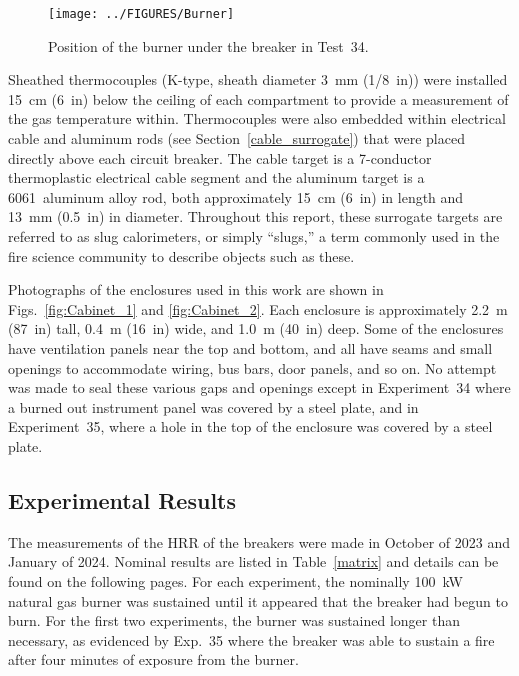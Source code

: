 \begin{figure}[ht]
\centering
\texttt{[image: ../FIGURES/Burner]}
\caption[Position of the burner] {Position of the burner under the breaker in Test~34.}
\label{fig:Burner}
\end{figure}

Sheathed thermocouples (K-type, sheath diameter 3~mm (1/8~in)) were installed 15~cm (6~in) below the ceiling of each compartment to provide a measurement of the gas temperature within. Thermocouples were also embedded within electrical cable and aluminum rods (see Section~\ref{cable_surrogate}) that were placed directly above each circuit breaker. The cable target is a 7-conductor thermoplastic electrical cable segment and the aluminum target is a 6061~aluminum alloy rod, both approximately  15~cm (6~in) in length and 13~mm (0.5~in) in diameter. Throughout this report, these surrogate targets are referred to as slug calorimeters, or simply ``slugs,'' a term commonly used in the fire science community to describe objects such as these.

Photographs of the enclosures used in this work are shown in Figs.~\ref{fig:Cabinet_1} and \ref{fig:Cabinet_2}. Each enclosure is approximately 2.2~m (87~in) tall, 0.4~m (16~in) wide, and 1.0~m (40~in) deep. Some of the enclosures have ventilation panels near the top and bottom, and all have seams and small openings to accommodate wiring, bus bars, door panels, and so on. No attempt was made to seal these various gaps and openings except in Experiment~34 where a burned out instrument panel was covered by a steel plate, and in Experiment~35, where a hole in the top of the enclosure was covered by a steel plate.



\subsection{Experimental Results}
\label{sec:results}

The measurements of the HRR of the breakers were made in October of 2023 and January of 2024. Nominal results are listed in Table~\ref{matrix} and details can be found on the following pages. For each experiment, the nominally 100~kW natural gas burner was sustained until it appeared that the breaker had begun to burn. For the first two experiments, the burner was sustained longer than necessary, as evidenced by Exp.~35 where the breaker was able to sustain a fire after four minutes of exposure from the burner.

